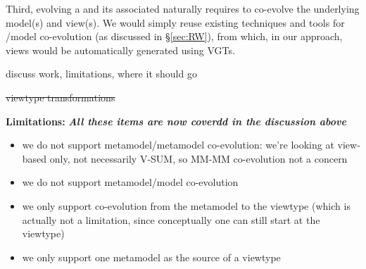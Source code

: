Third, evolving a \metamodel and its associated \viewtypes naturally requires to
co-evolve the underlying model(s) and view(s). We would simply reuse existing 
techniques and tools for \metamodel/model co-evolution (as discussed in \S \ref{sec:RW}),
from which, in our approach, views would be automatically generated using VGTs.




discuss work, limitations, where it should go

\st{viewtype transformations}



\textbf{Limitations:} \textbf{\textsl{All these items are now coverdd in the discussion above}}
\begin{itemize}
    \item we do not support metamodel/metamodel co-evolution: we’re looking 
		at view-based only, not necessarily V-SUM, so MM-MM co-evolution not a concern
    \item we do not support metamodel/model co-evolution
    \item we only support co-evolution from the metamodel to the viewtype (which is actually not a limitation, since conceptually one can still start at the viewtype)
    \item we only support one metamodel as the source of a viewtype
\end{itemize}